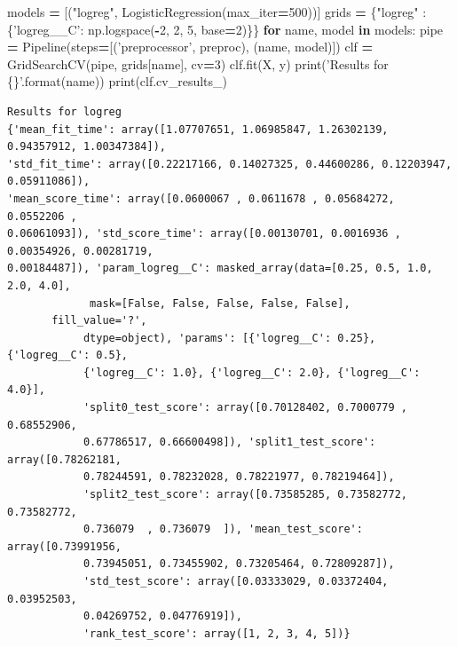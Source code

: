 \documentclass[10pt,a4paper]{article}
\newenvironment{Shaded}{\begin{snugshade}}{\end{snugshade}}
\newcommand{\BuiltInTok}[1]{#1}
\newcommand{\ControlFlowTok}[1]{\textcolor[rgb]{0.13,0.29,0.53}{\textbf{#1}}}
\newcommand{\DecValTok}[1]{\textcolor[rgb]{0.00,0.00,0.81}{#1}}
\newcommand{\KeywordTok}[1]{\textcolor[rgb]{0.13,0.29,0.53}{\textbf{#1}}}
\newcommand{\NormalTok}[1]{#1}
\newcommand{\OperatorTok}[1]{\textcolor[rgb]{0.81,0.36,0.00}{\textbf{#1}}}
\newcommand{\SpecialCharTok}[1]{\textcolor[rgb]{0.00,0.00,0.00}{#1}}
\newcommand{\StringTok}[1]{\textcolor[rgb]{0.31,0.60,0.02}{#1}}
\theoremstyle{break}
\begin{document}
\begin{Shaded}
\begin{Highlighting}[]
\NormalTok{models }\OperatorTok{=}\NormalTok{ [(}\StringTok{"logreg"}\NormalTok{, LogisticRegression(max_iter}\OperatorTok{=}\DecValTok{500}\NormalTok{))]}
\NormalTok{grids }\OperatorTok{=}\NormalTok{ \{}\StringTok{"logreg"}\NormalTok{ : \{}\StringTok{'logreg__C'}\NormalTok{: np.logspace(}\OperatorTok{-}\DecValTok{2}\NormalTok{, }\DecValTok{2}\NormalTok{, }\DecValTok{5}\NormalTok{, base}\OperatorTok{=}\DecValTok{2}\NormalTok{)\}\}}
\ControlFlowTok{for}\NormalTok{ name, model }\KeywordTok{in}\NormalTok{ models:}
\NormalTok{    pipe }\OperatorTok{=}\NormalTok{ Pipeline(steps}\OperatorTok{=}\NormalTok{[(}\StringTok{'preprocessor'}\NormalTok{, preproc), (name, model)])}
\NormalTok{    clf }\OperatorTok{=}\NormalTok{ GridSearchCV(pipe, grids[name], cv}\OperatorTok{=}\DecValTok{3}\NormalTok{)}
\NormalTok{    clf.fit(X, y)}
    \BuiltInTok{print}\NormalTok{(}\StringTok{'Results for }\SpecialCharTok{\{\}}\StringTok{'}\NormalTok{.}\BuiltInTok{format}\NormalTok{(name))}
    \BuiltInTok{print}\NormalTok{(clf.cv_results_)}
\end{Highlighting}
\end{Shaded}

\begin{verbatim}
Results for logreg
{'mean_fit_time': array([1.07707651, 1.06985847, 1.26302139, 0.94357912, 1.00347384]),
'std_fit_time': array([0.22217166, 0.14027325, 0.44600286, 0.12203947, 0.05911086]),
'mean_score_time': array([0.0600067 , 0.0611678 , 0.05684272, 0.0552206 ,
0.06061093]), 'std_score_time': array([0.00130701, 0.0016936 , 0.00354926, 0.00281719,
0.00184487]), 'param_logreg__C': masked_array(data=[0.25, 0.5, 1.0, 2.0, 4.0],
             mask=[False, False, False, False, False],
       fill_value='?',
            dtype=object), 'params': [{'logreg__C': 0.25}, {'logreg__C': 0.5},
            {'logreg__C': 1.0}, {'logreg__C': 2.0}, {'logreg__C': 4.0}],
            'split0_test_score': array([0.70128402, 0.7000779 , 0.68552906,
            0.67786517, 0.66600498]), 'split1_test_score': array([0.78262181,
            0.78244591, 0.78232028, 0.78221977, 0.78219464]),
            'split2_test_score': array([0.73585285, 0.73582772, 0.73582772,
            0.736079  , 0.736079  ]), 'mean_test_score': array([0.73991956,
            0.73945051, 0.73455902, 0.73205464, 0.72809287]),
            'std_test_score': array([0.03333029, 0.03372404, 0.03952503,
            0.04269752, 0.04776919]),
            'rank_test_score': array([1, 2, 3, 4, 5])}
\end{verbatim}
\end{document}
